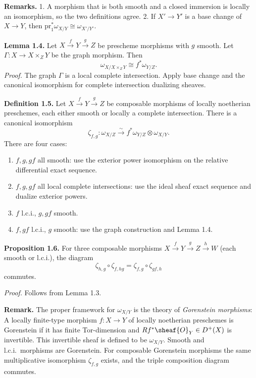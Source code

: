 \textbf{Remarks.}
1. A morphism that is both smooth and a closed immersion is locally an isomorphism, so the two definitions agree.
2. If $X'\to Y'$ is a base change of $X\to Y$, then $\mathrm{pr}_1^*\omega_{X/Y} \cong \omega_{X'/Y'}$.

\setcounter{page}{142}
\textbf{Lemma 1.4.}
Let $X\xrightarrow{f}Y\xrightarrow{g}Z$ be prescheme morphisms with $g$ smooth.
Let $\Gamma\colon X\to X\times_Z Y$ be the graph morphism. Then
\[
\omega_{X/X\times_Z Y} \cong f^*\omega_{Y/Z}.
\]
\textit{Proof.}
The graph $\Gamma$ is a local complete intersection. Apply base change and the canonical isomorphism for complete intersection dualizing sheaves.

\setcounter{page}{143}
\textbf{Definition 1.5.}
Let $X\xrightarrow{f}Y\xrightarrow{g}Z$ be composable morphisms of locally noetherian preschemes, each either smooth or locally a complete intersection. There is a canonical isomorphism
\[
\zeta_{f,g}\colon \omega_{X/Z} \xrightarrow{\sim} f^*\omega_{Y/Z} \otimes \omega_{X/Y}.
\]
There are four cases:
\begin{enumerate}
\item[(a)] $f,g,gf$ all smooth: use the exterior power isomorphism on the relative differential exact sequence.
\item[(b)] $f,g,gf$ all local complete intersections: use the ideal sheaf exact sequence and dualize exterior powers.
\item[(c)] $f$ l.c.i., $g,gf$ smooth.
\item[(d)] $f,gf$ l.c.i., $g$ smooth: use the graph construction and Lemma 1.4.
\end{enumerate}

\textbf{Proposition 1.6.}
For three composable morphisms $X\xrightarrow{f}Y\xrightarrow{g}Z\xrightarrow{h}W$ (each smooth or l.c.i.), the diagram
\[
\zeta_{h,g}\circ\zeta_{f,hg} = \zeta_{f,g}\circ\zeta_{gf,h}
\]
commutes.

\textit{Proof.} Follows from Lemma 1.3.

\setcounter{page}{144}
\textbf{Remark.}
The proper framework for $\omega_{X/Y}$ is the theory of \textit{Gorenstein morphisms}:
A locally finite-type morphism $f\colon X\to Y$ of locally noetherian preschemes is Gorenstein if it has finite Tor-dimension and $Rf^*\sheaf{O}_Y\in D^+(X)$ is invertible. This invertible sheaf is defined to be $\omega_{X/Y}$. Smooth and l.c.i.\ morphisms are Gorenstein. For composable Gorenstein morphisms the same multiplicative isomorphism $\zeta_{f,g}$ exists, and the triple composition diagram commutes.